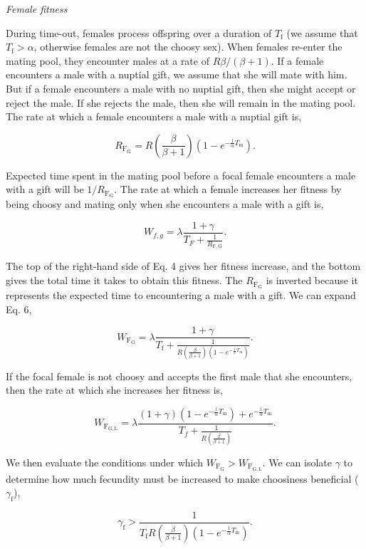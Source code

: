 \documentclass[
]{article}
\begin{document}
\emph{Female fitness}

During time-out, females process offspring over a duration of
\(T_{\mathrm{f}}\) (we assume that \(T_{\mathrm{f}} > \alpha\),
otherwise females are not the choosy sex). When females re-enter the
mating pool, they encounter males at a rate of \(R\beta/(\beta + 1)\).
If a female encounters a male with a nuptial gift, we assume that she
will mate with him. But if a female encounters a male with no nuptial
gift, then she might accept or reject the male. If she rejects the male,
then she will remain in the mating pool. The rate at which a female
encounters a male with a nuptial gift is,

\[R_{\mathrm{F_{G}}} = R \left(\frac{\beta}{\beta + 1}\right)\left(1 - e^{-\frac{1}{\alpha}T_{\mathrm{m}}}\right).\]

Expected time spent in the mating pool before a focal female encounters
a male with a gift will be \(1/R_{\mathrm{F_{G}}}\). The rate at which a
female increases her fitness by being choosy and mating only when she
encounters a male with a gift is,

\[W_{f, g} = \lambda \frac{1 + \gamma}{T_{F} + \frac{1}{R_{\mathrm{F,G}}}}.
\tag{4}
\]

The top of the right-hand side of Eq. 4 gives her fitness increase, and
the bottom gives the total time it takes to obtain this fitness. The
\(R_{\mathrm{F_{G}}}\) is inverted because it represents the expected
time to encountering a male with a gift. We can expand Eq. 6,

\[W_{\mathrm{F_{G}}} = \lambda \frac{1 + \gamma}{T_{\mathrm{f}} + \frac{1}{R \left(\frac{\beta}{\beta + 1}\right)\left(1 - e^{-\frac{1}{\alpha}T_{\mathrm{m}}}\right)}}.\]

If the focal female is not choosy and accepts the first male that she
encounters, then the rate at which she increases her fitness is,

\[W_{\mathrm{F_{G,L}}} = \lambda \frac{\left(1 + \gamma\right)\left(1 - e^{-\frac{1}{\alpha}T_{\mathrm{m}}}\right) + e^{-\frac{1}{\alpha}T_{\mathrm{m}}}}{T_{f} + \frac{1}{R \left(\frac{\beta}{\beta + 1}\right)}}.\]

We then evaluate the conditions under which
\(W_{\mathrm{F_{G}}} > W_{\mathrm{F_{G,L}}}\). We can isolate \(\gamma\)
to determine how much fecundity must be increased to make choosiness
beneficial (\(\gamma_{\mathrm{f}}\)),

\[\gamma_{\mathrm{f}} > \frac{1}{T_{\mathrm{f}} R\left(\frac{\beta}{\beta + 1}\right) \left(1 - e^{-\frac{1}{\alpha}T_{\mathrm{m}}}\right)}.
\tag{5}
\]
\end{document}
